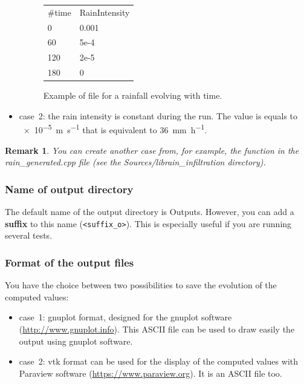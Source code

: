 \documentclass[a4paper, 11pt]{article}
\newtheorem{rmk}{Remark}
\begin{document}
\begin{itemize}
	      \begin{figure}[htpb]
		      \centering
		      \begin{tt}
			      \begin{tabular}{ll}
				      \#time & RainIntensity \\
				      0      & 0.001         \\
				      60     & 5e-4          \\
				      120    & 2e-5          \\
				      180    & 0
			      \end{tabular}
		      \end{tt}
		      \caption{Example of file for a rainfall evolving with time.\label{Fig:RainFile}}
	      \end{figure}

	\item case~2: the rain intensity is constant during the run.
	      The value is equals to \SI{e-5}{\meter\per\second} that is equivalent to \SI{36}{\milli\meter\per\hour}.
\end{itemize}
\begin{rmk}
	You can create another case from, for example, the function in the \textnormal{\textsf{rain\_generated.cpp}} file (see the  \textnormal{\textsf{Sources/librain\_infiltration}} directory).
\end{rmk}

\subsubsection{Name of output directory}

The default name of the output directory is \textsf{Outputs}.
However, you can add a \textbf{suffix} to this name (\texttt{<suffix\_o>}).
This is especially useful if you are running several tests.

\subsubsection{Format of the output files}

You have the choice between two possibilities to save the evolution of the computed values:
\begin{itemize}
	\item case~1: gnuplot format, designed for the gnuplot software (\url{http://www.gnuplot.info}).
	      This ASCII file can be used to draw easily the output using gnuplot software.
	\item case~2: vtk format can be used for the display of the computed values with Paraview software (\url{https://www.paraview.org}).
	      It is an ASCII file too.
\end{itemize}
\end{document}
